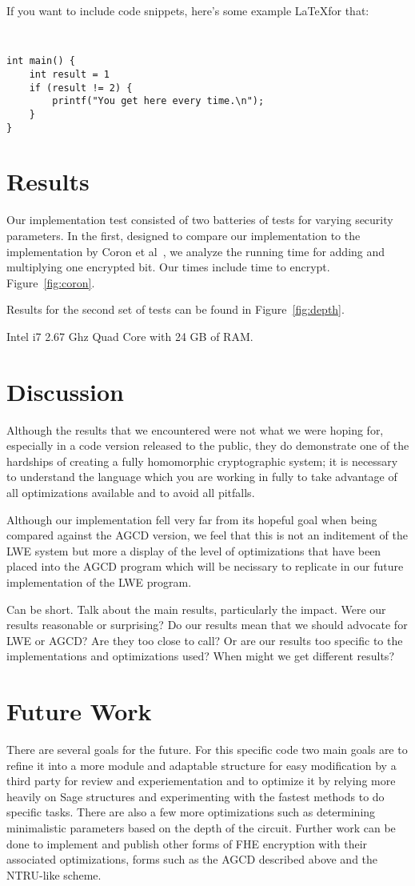 \documentclass[letterpaper,twocolumn,10pt]{article}
\begin{document}
If you want to include code snippets, here's some example \LaTeX for that:

{\tt \small
\begin{verbatim}
int main() {
    int result = 1
    if (result != 2) {
        printf("You get here every time.\n");
    }
}
\end{verbatim}
}


\section{Results}
Our implementation test consisted of two batteries of tests for varying security parameters. In the first, designed to compare our implementation to the implementation by Coron et al~\cite{CNT}, we analyze the running time for adding and multiplying one encrypted bit. Our times include time to encrypt. Figure~\ref{fig:coron}.

Results for the second set of tests can be found in Figure~\ref{fig:depth}.

Intel i7 2.67 Ghz Quad Core with 24 GB of RAM.


\section{Discussion}
Although the results that we encountered were not what we were hoping for, especially in a code version released to the public, they do demonstrate one of the hardships of creating a fully homomorphic cryptographic system; it is necessary to understand the language which you are working in fully to take advantage of all optimizations available and to avoid all pitfalls.

Although our implementation fell very far from its hopeful goal when being compared against the AGCD version, we feel that this is not an inditement of the LWE system but more a display of the level of optimizations that have been placed into the AGCD program which will be necissary to replicate in our future implementation of the LWE program.

Can be short. Talk about the main results, particularly the impact. Were our results reasonable or surprising? Do our results mean that we should advocate for LWE or AGCD? Are they too close to call? Or are our results too specific to the implementations and optimizations used? When might we get different results?


\section{Future Work}
There are several goals for the future. For this specific code two main goals are to refine it into a more module and adaptable structure for easy modification by a third party for review and experiementation and to optimize it by relying more heavily on Sage structures and experimenting with the fastest methods to do specific tasks. There are also a few more optimizations such as determining minimalistic parameters based on the depth of the circuit. 
Further work can be done to implement and publish other forms of FHE encryption with their associated optimizations, forms such as the AGCD described above and the NTRU-like scheme.
\end{document}
